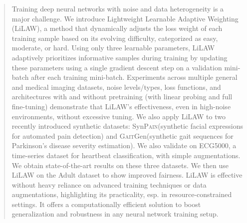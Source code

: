 \documentclass{article}
\theoremstyle{plain}
\theoremstyle{definition}
\theoremstyle{remark}
\begin{document}

\newcommand{\synpain}{Syn\textsc{Pain}\xspace}
\newcommand{\gaitgen}{\textsc{Gait}Gen\xspace}

\printAffiliationsAndNotice{}  %

\begin{abstract}
Training deep neural networks with noise and data heterogeneity is a major challenge. We introduce Lightweight Learnable Adaptive Weighting (LiLAW), a method that dynamically adjusts the loss weight of each training sample based on its evolving difficulty, categorized as easy, moderate, or hard. Using only three learnable parameters, LiLAW adaptively prioritizes informative samples during training by updating these parameters using a single gradient descent step on a validation mini-batch after each training mini-batch.
Experiments across multiple general and medical imaging datasets, noise levels/types, loss functions, and architectures with and without pretraining (with linear probing and full fine-tuning) demonstrate that LiLAW's effectiveness, even in high-noise environments, without excessive tuning. 
We also apply LiLAW to two recently introduced synthetic datasets: \synpain (synthetic facial expressions for automated pain detection) and \gaitgen (synthetic gait sequences for Parkinson's disease severity estimation). We also validate on ECG5000, a time-series dataset for heartbeat classification, with simple augmentations. We obtain state-of-the-art results on these three datasets. We then use LiLAW on the Adult dataset to show improved fairness. LiLAW is effective without heavy reliance on advanced training techniques or data augmentations, highlighting its practicality, esp. in resource-constrained settings. It offers a computationally efficient solution to boost generalization and robustness in any neural network training setup. %

\end{abstract}
\end{document}
